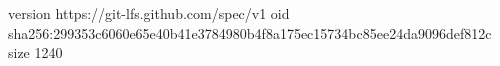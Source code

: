 version https://git-lfs.github.com/spec/v1
oid sha256:299353c6060e65e40b41e3784980b4f8a175ec15734bc85ee24da9096def812c
size 1240
